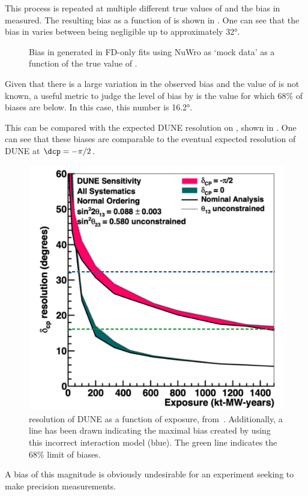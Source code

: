 This process is repeated at multiple different true values of \dcp and the bias in \dcp measured. 
The resulting bias as a function of \dcpTrue is shown in .
One can see that the bias in \dcp varies between being negligible up to approximately \ang{32}. 

\begin{figure}[h]
	\begin{adjustbox}{max totalsize=.6\linewidth, center}
		
	\end{adjustbox}
	\caption[Example of \dcp bias in FD-only fits using NuWro data.]{Bias in \dcp generated in FD-only fits using NuWro as `mock data' as a function of the true value of \dcp.}
	\label{fig:dcpBiasNoWgt}
\end{figure}

Given that there is a large variation in the observed bias and the value of \dcp is not known, a useful metric to judge the level of bias by is the value for which 68\% of biases are below.
In this case, this number is \ang{16.2}.

This can be compared with the expected DUNE resolution on \dcp, shown in . 
One can see that these biases are comparable to the eventual expected \dcp resolution of DUNE at $\dcp = -\pi/2$.
\begin{figure}[h]
	\centering
	\includegraphics[width=.5\linewidth]{files/figures/dune_ndrwt/dcpResWithLines-cropped}
	\caption[\dcp resolution of DUNE as a function of exposure.]{\dcp resolution of DUNE as a function of exposure, from~\cite{Abi:2020qib}. Additionally, a line has been drawn indicating the maximal \dcp bias created by using this incorrect interaction model (blue). The green line indicates the 68\% limit of \dcp biases.}
	\label{fig:dcpResDUNE}
\end{figure}
A bias of this magnitude is obviously undesirable for an experiment seeking to make precision measurements.

